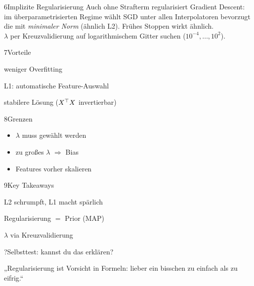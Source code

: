 \begin{hngrid}
\begin{hnp}[raster multicolumn=3,acc=hnrose]{6}{Implizite Regularisierung}
Auch ohne Strafterm regularisiert Gradient Descent: im überparametrisierten Regime wählt SGD unter allen Interpolatoren bevorzugt die mit \emph{minimaler Norm} (ähnlich L2). Frühes Stoppen wirkt ähnlich.\\
 $\lambda$ per Kreuzvalidierung auf logarithmischem Gitter suchen ($10^{-4},\dots,10^{2}$).
\end{hnp}
%
\begin{hnp}[raster multicolumn=2,acc=hngreen]{7}{Vorteile}
\begin{hnpro}
\item weniger Overfitting
\item L1: automatische Feature-Auswahl
\item stabilere Lösung ($X^{\top} X$ invertierbar)
\end{hnpro}
\end{hnp}
%
\begin{hnp}[raster multicolumn=2,acc=hnred]{8}{Grenzen}
\begin{itemize}
\item[\textcolor{hnred}{$\times$}] $\lambda$ muss gewählt werden
\item[\textcolor{hnred}{$\times$}] zu großes $\lambda$ $\Rightarrow$ Bias
\item[\textcolor{hnred}{$\times$}] Features vorher skalieren
\end{itemize}
\end{hnp}
%
\begin{hnp}[raster multicolumn=2,acc=hnorange]{9}{Key Takeaways}
\begin{hnchk}
\item L2 schrumpft, L1 macht spärlich
\item Regularisierung $=$ Prior (MAP)
\item $\lambda$ via Kreuzvalidierung
\end{hnchk}
\end{hnp}
%
\begin{hnp}[raster multicolumn=6,acc=hnpurple,colback=hnlilac!30]{?}{Selbsttest: kannst du das erklären?}
\end{hnp}
%
\begin{hnbanner}[raster multicolumn=6]
„Regularisierung ist Vorsicht in Formeln: lieber ein bisschen zu einfach als zu eifrig.“
\end{hnbanner}
\end{hngrid}
